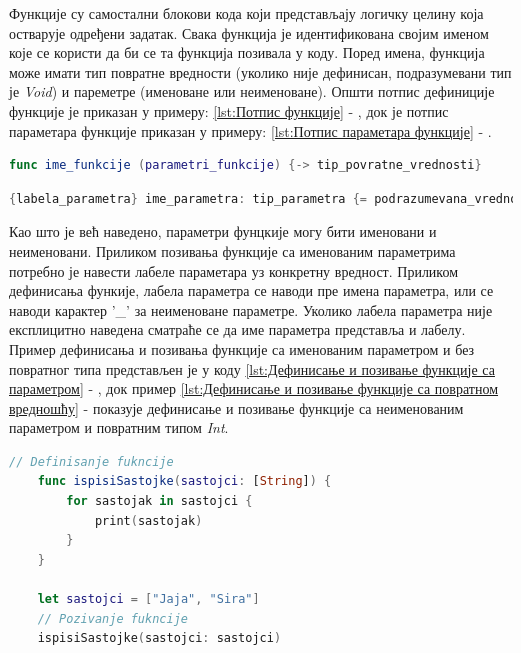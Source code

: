 \documentclass[12pt,oneside]{memoir}
\begin{document}
\indent Функције су самостални блокови кода који представљају логичку целину која остварује одређени задатак. Свака функција је идентификована својим именом које се користи да би се та функција позивала у коду. Поред имена, функција може имати тип повратне вредности (уколико није дефинисан, подразумевани тип је \textit{Void}) и пареметре (именоване или неименоване). Општи потпис дефиниције функције је приказан у примеру: \ref{lst:Потпис функције} - , док је потпис параметара функције приказан у примеру: \ref{lst:Потпис параметара функције} - .

\begin{lstlisting}[caption=\textit{{Потпис функције}}, label={lst:Потпис функције}, language=Swift, frame=single]
func ime_funkcije (parametri_funkcije) {-> tip_povratne_vrednosti}
\end{lstlisting}

\begin{lstlisting}[caption=\textit{{Потпис параметара функције}}, label={lst:Потпис параметара функције}, language=Swift, frame=single]
{labela_parametra} ime_parametra: tip_parametra {= podrazumevana_vrednost}
\end{lstlisting}

\indent Као што је већ наведено, параметри фунцкије могу бити именовани и неименовани. Приликом позивања функције са именованим параметрима потребно је навести лабеле параметара уз конкретну вредност. Приликом дефинисања функије, лабела параметра се наводи пре имена параметра, или се наводи карактер '\_' за неименоване параметре. Уколико лабела параметра није експлицитно наведена сматраће се да име параметра представља и лабелу. Пример дефинисања и позивања функције са именованим параметром и без повратног типа представљен је у коду \ref{lst:Дефинисање и позивање функције са параметром} - , док пример \ref{lst:Дефинисање и позивање функције са повратном вредношћу} -  показује дефинисање и позивање функције са неименованим параметром и повратним типом \textit{Int}.

\begin{lstlisting}[caption=\textit{{Дефинисање и позивање функције са параметром}}, label={lst:Дефинисање и позивање функције са параметром}, language=Swift, frame=single]
    // Definisanje fukncije
    func ispisiSastojke(sastojci: [String]) {
        for sastojak in sastojci {
            print(sastojak)
        }
    }
    
    let sastojci = ["Jaja", "Sira"]
    // Pozivanje fukncije
    ispisiSastojke(sastojci: sastojci)
\end{lstlisting}
\end{document}
